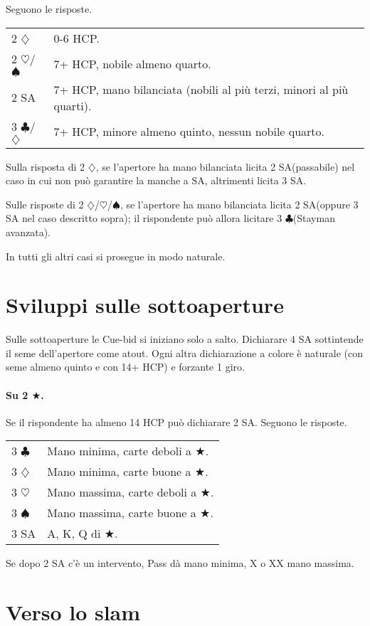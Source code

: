 \documentclass[a4paper,10pt]{article}
\renewcommand{\c}{$\clubsuit$\xspace}
\renewcommand{\d}{$\diamondsuit$\xspace}
\newcommand{\h}{$\heartsuit$\xspace}
\newcommand{\s}{$\spadesuit$\xspace}
\renewcommand{\j}{$\bigstar$\xspace}
\newcommand{\sa}{SA\xspace}
\newcommand{\smallspace}{\vskip0.3cm}
\newenvironment{twocol}
  {\smallspace\noindent\begin{tabular}{l p{0.78\textwidth}}}
  {\end{tabular}\smallspace}
\begin{document}
Seguono le risposte.
\begin{twocol}
  2 \d & 0-6 HCP.\\
  2 \h/\s & 7+ HCP, nobile almeno quarto.\\
  2 \sa & 7+ HCP, mano bilanciata (nobili al più terzi, minori al più quarti).\\
  3 \c/\d & 7+ HCP, minore almeno quinto, nessun nobile quarto.\\
\end{twocol}

Sulla risposta di 2 \d, se l'apertore ha mano bilanciata licita 2 \sa (passabile) nel caso in cui non può garantire la manche a \sa, altrimenti licita 3 \sa.

Sulle risposte di 2 \d/\h/\s, se l'apertore ha mano bilanciata licita 2 \sa (oppure 3 \sa nel caso descritto sopra); il rispondente può allora licitare 3 \c (Stayman avanzata).

In tutti gli altri casi si prosegue in modo naturale.


\pagebreak

\section{Sviluppi sulle sottoaperture}

Sulle sottoaperture le Cue-bid si iniziano solo a salto. Dichiarare 4 \sa sottintende il seme dell'apertore come atout. Ogni altra dichiarazione a colore è naturale (con seme almeno quinto e con 14+ HCP) e forzante 1 giro.

\paragraph{Su 2 \j.} Se il rispondente ha almeno 14 HCP può dichiarare 2 \sa. Seguono le risposte.
\begin{twocol}
 3 \c & Mano minima, carte deboli a \j.\\
 3 \d & Mano minima, carte buone a \j.\\
 3 \h & Mano massima, carte deboli a \j.\\
 3 \s & Mano massima, carte buone a \j.\\
 3 \sa & A, K, Q di \j.
\end{twocol}

\noindent Se dopo 2 \sa c'è un intervento, Pass dà mano minima, X o XX mano massima.



\pagebreak

\section{Verso lo slam}
\end{document}
